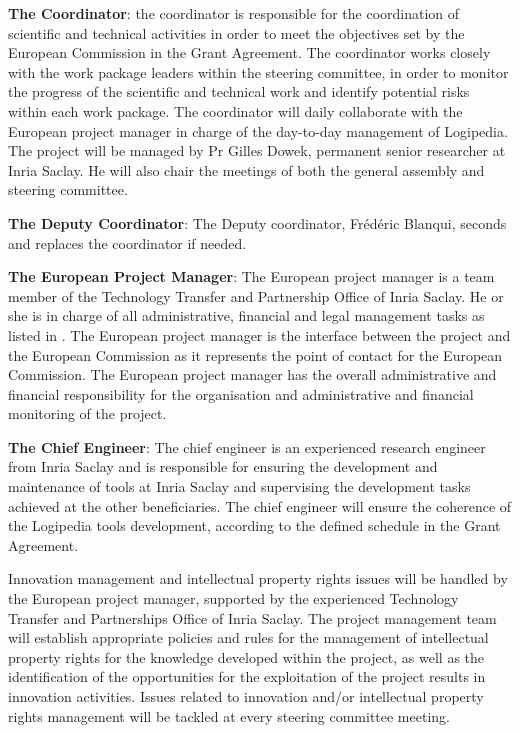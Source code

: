 \begin{compactitem}
\item{\bf The Coordinator}: the 
coordinator is responsible for the coordination of
scientific and technical activities in order to meet the objectives
set by the European Commission in the Grant Agreement. The 
coordinator works closely with the work package leaders
within the steering committee, in order to monitor the progress of the
scientific and technical work and identify potential risks within each
work package. The coordinator will daily
collaborate with the European project manager in charge of the
day-to-day management of Logipedia. The project will be managed by Pr
Gilles Dowek, permanent senior researcher at Inria Saclay. He will
also chair the meetings of both the general assembly and steering
committee.

\item{\bf The Deputy Coordinator}: The Deputy coordinator, Frédéric
Blanqui, seconds and replaces the coordinator if needed.

\item{\bf The European Project Manager}: The European project manager
  is a team member of the Technology Transfer and Partnership Office
  of Inria Saclay. He or she is in charge of all administrative,
  financial and legal management tasks as listed in
  . The European project manager is the interface
  between the project and the European Commission as it represents the
  point of contact for the European Commission. The European project
  manager has the overall administrative and financial responsibility
  for the organisation and administrative and financial monitoring of
  the project.

\item{\bf The Chief Engineer}: The chief engineer is an experienced
research engineer from Inria Saclay and is responsible for ensuring
the development and maintenance of tools at Inria Saclay and
supervising the development tasks achieved at the other
beneficiaries. The chief engineer will ensure the coherence of the
Logipedia tools development, according to the defined schedule in the
Grant Agreement.
\end{compactitem}

Innovation management and intellectual property rights issues will be
handled by the European project manager, supported by the experienced
Technology Transfer and Partnerships Office of Inria Saclay. The
project management team will establish appropriate policies and rules
for the management of intellectual property rights for the knowledge
developed within the project, as well as the identification of the
opportunities for the exploitation of the project results in
innovation activities. Issues related to innovation and/or
intellectual property rights management will be tackled at every
steering committee meeting.

